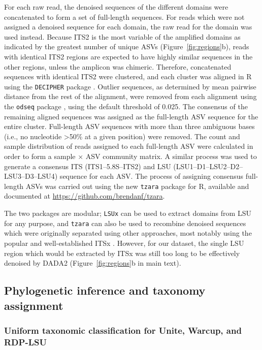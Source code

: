 \documentclass[
]{article}
\begin{document}
For each raw read, the denoised sequences of the different domains were concatenated to form a set of full-length sequences.
For reads which were not assigned a denoised sequence for each domain, the raw read for the domain was used instead.
Because ITS2 is the most variable of the amplified domains as indicated by the greatest number of unique ASVs (Figure~\ref{fig:regions}b), reads with identical ITS2 regions are expected to have highly similar sequences in the other regions, unless the amplicon was chimeric.
Therefore, concatenated sequences with identical ITS2 were clustered, and each cluster was aligned in R using the \texttt{DECIPHER} package \autocite{wright2015}.
Outlier sequences, as determined by mean pairwise distance from the rest of the alignment, were removed from each alignment using the \texttt{odseq} package \autocite{jehl2015}, using the default threshold of 0.025.
The consensus of the remaining aligned sequences was assigned as the full-length ASV sequence for the entire cluster.
Full-length ASV sequences with more than three ambiguous bases (i.e., no nucleotide \textgreater50\% at a given position) were removed.
The count and sample distribution of reads assigned to each full-length ASV were calculated in order to form a sample × ASV community matrix.
A similar process was used to generate a consensus ITS (ITS1--5.8S--ITS2) and LSU (LSU1--D1--LSU2--D2--LSU3--D3--LSU4) sequence for each ASV.
The process of assigning consensus full-length ASVs was carried out using the new \texttt{tzara} package for R, available and documented at \url{https://github.com/brendanf/tzara}.

The two packages are modular; \texttt{LSUx} can be used to extract domains from LSU for any purpose, and \texttt{tzara} can also be used to recombine denoised sequences which were originally separated using other approaches, most notably using the popular and well-established ITSx \autocite{bengtsson-palme2013}.
However, for our dataset, the single LSU region which would be extracted by ITSx was still too long to be effectively denoised by DADA2 (Figure~\ref{fig:regions}b in main text).

\hypertarget{phylogeny-supplement}{%
\subsection{Phylogenetic inference and taxonomy assignment}\label{phylogeny-supplement}}

\hypertarget{reannotate}{%
\subsubsection{Uniform taxonomic classification for Unite, Warcup, and RDP-LSU}\label{reannotate}}
\end{document}
